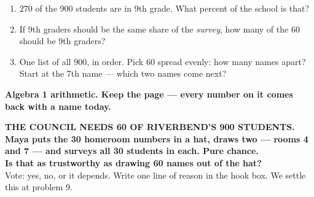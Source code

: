 \documentclass[aspectratio=169, 11pt]{beamer}
\begin{document}
\begin{frame}[t, plain]
  \vspace{0.3cm}
  \begin{center}
    \begin{minipage}{0.86\textwidth}
      \begin{enumerate}\setlength{\itemsep}{7pt}
        \item $270$ of the $900$ students are in 9th grade. What percent of the school is that?
        \item If 9th graders should be the same share of the \emph{survey}, how many of the
              $60$ should be 9th graders?
        \item One list of all $900$, in order. Pick $60$ spread evenly: how many names apart?
              Start at the 7th name --- which two names come next?
      \end{enumerate}
    \end{minipage}
  \end{center}
  \vspace{0.4cm}
  \begin{center}
    {\color{cerulean}\bfseries Algebra 1 arithmetic. Keep the page --- every number on it
    comes back with a name today.}
  \end{center}
\end{frame}

{
\begin{frame}[plain]
  \vspace{1.2cm}
  \begin{center}
    {\color{frostmid}\bfseries\small THE COUNCIL NEEDS 60 OF RIVERBEND'S 900 STUDENTS.}\\[0.7cm]
    {\color{white}\bfseries\Large Maya puts the 30 homeroom numbers in a hat, draws two ---
    rooms 4 and 7 --- and surveys all 30 students in each. Pure chance.}\\[0.9cm]
    {\color{goldacc}\bfseries\large Is that as trustworthy as drawing 60 names out of the hat?}\\[0.5cm]
    {\color{frostmid}\small Vote: yes, no, or it depends. Write one line of reason in the hook
    box. We settle this at problem 9.}
  \end{center}
\end{frame}
}
\end{document}
